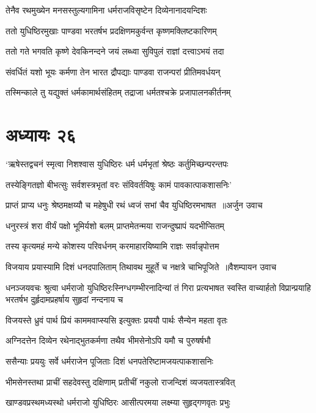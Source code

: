 \twolineshloka
{तेनैव रथमुख्येन मनसस्तुल्यगामिना}
{धर्मराजविसृष्टेन दिव्येनानादयन्दिशः}


\twolineshloka
{ततो युधिष्ठिरमुखाः पाण्डवा भरतर्षभ}
{प्रदक्षिणमकुर्वन्त कृष्णमक्लिष्टकारिणम्}


\twolineshloka
{ततो गते भगवति कृष्णे देवकिनन्दने}
{जयं लब्ध्वा सुविपुलं राज्ञां दत्त्वाऽभयं तदा}


\twolineshloka
{संवर्धितं यशो भूयः कर्मणा तेन भारत}
{द्रौपद्याः पाण्डवा राजन्परां प्रीतिमवर्धयन्}


\twolineshloka
{तस्मिन्काले तु यद्युक्तं धर्मकामार्थसंहितम्}
{तद्राजा धर्मतश्चक्रे प्रजापालनकीर्तनम्}


\chapter{अध्यायः २६}
\threelineshloka
{`ऋषेस्तद्वचनं स्मृत्वा निशश्वास युधिष्ठिरः}
{धर्म धर्मभृतां श्रेष्ठः कर्तुमिच्छन्परन्तपः}
{}


\twolineshloka
{तस्येङ्गितज्ञो बीभत्सुः सर्वशस्त्रभृतां वरः}
{संविवर्तयिषुः कामं पावकात्पाकशासनिः'}


\threelineshloka
{प्राप्तं प्राप्य धनुः श्रेष्ठमक्षय्यौ च महेषुधी}
{रथं ध्वजं सभां चैव युधिष्ठिरमभाषत ॥अर्जुन उवाच}
{}


\twolineshloka
{धनुरस्त्रं शरा वीर्यं पक्षो भूमिर्यशो बलम्}
{प्राप्तमेतन्मया राजन्दुष्प्रापं यदभीप्सितम्}


\twolineshloka
{तस्य कृत्यमहं मन्ये कोशस्य परिवर्धनम्}
{करमाहारयिष्यामि राज्ञः सर्वान्नृपोत्तम}


\threelineshloka
{विजयाय प्रयास्यामि दिशं धनदपालिताम्}
{तिथावथ मुहूर्ते च नक्षत्रे चाभिपूजिते ॥वैशम्पायन उवाच}
{}


धनञ्जयवचः श्रुत्वा धर्मराजो युधिष्ठिरःस्निग्धगम्भीरनादिन्यां तं गिरा प्रत्यभाषत
\twolineshloka
{स्वस्ति वाच्यार्हतो विप्रान्प्रयाहि भरतर्षभ}
{दुर्हृदामप्रहर्षाय सुहृदां नन्दनाय च}


\twolineshloka
{विजयस्ते ध्रुवं पार्थ प्रियं काममवाप्स्यसि}
{इत्युक्तः प्रययौ पार्थः सैन्येन महता वृतः}


\twolineshloka
{अग्निदत्तेन दिव्येन रथेनाद्भुतकर्मणा}
{तथैव भीमसेनोऽपि यमौ च पुरुषर्षभौ}


\twolineshloka
{ससैन्याः प्रययुः सर्वे धर्मराजेन पूजिताः}
{दिशं धनपतेरिष्टामजयत्पाकशासनिः}


\twolineshloka
{भीमसेनस्तथा प्राचीं सहदेवस्तु दक्षिणाम्}
{प्रतीचीं नकुलो राजन्दिशं व्यजयतास्त्रवित्}


\twolineshloka
{खाण्डवप्रस्थमध्यस्थो धर्मराजो युधिष्ठिरः}
{आसीत्परमया लक्ष्म्या सुहृद्गणवृतः प्रभुः}


